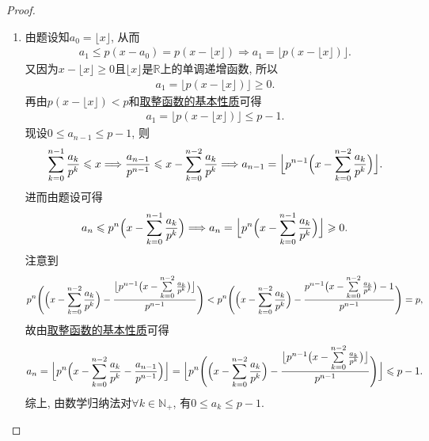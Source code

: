 \documentclass[../../main.tex]{subfiles}%
\begin{document}
\begin{proof}
\begin{enumerate}[(1)]
\item 由题设知$a_0=\lfloor x \rfloor$, 从而
\begin{align*}
a_1\leqslant p\left( x-a_0 \right) =p\left( x-\lfloor x \rfloor \right) \Longrightarrow a_1=\lfloor p\left( x-\lfloor x \rfloor \right) \rfloor .
\end{align*}
又因为$x-\lfloor x \rfloor \geqslant 0$且$\lfloor x \rfloor$是$\mathbb{R}$上的单调递增函数, 所以
\begin{align*}
a_1=\lfloor p\left( x-\lfloor x \rfloor \right) \rfloor \geqslant 0.
\end{align*}
再由$p\left( x-\lfloor x \rfloor \right) <p$和\hyperref[proposition:取整函数的基本性质]{取整函数的基本性质}可得
\begin{align*}
a_1=\lfloor p\left( x-\lfloor x \rfloor \right) \rfloor \leqslant p-1.
\end{align*}
现设$0\leqslant a_{n-1}\leqslant p-1$, 则
\begin{align*}
\sum_{k=0}^{n-1}\frac{a_k}{p^k}\leqslant x\Longrightarrow \frac{a_{n-1}}{p^{n-1}}\leqslant x-\sum_{k=0}^{n-2}\frac{a_k}{p^k}\Longrightarrow a_{n-1}=\Bigl\lfloor p^{n-1}\Bigl( x-\sum_{k=0}^{n-2}\frac{a_k}{p^k} \Bigr) \Bigr\rfloor .
\end{align*}
进而由题设可得
\begin{align*}
a_n\leqslant p^n\Bigl( x-\sum_{k=0}^{n-1}\frac{a_k}{p^k} \Bigr) \Longrightarrow a_n=\Bigl\lfloor p^n\Bigl( x-\sum_{k=0}^{n-1}\frac{a_k}{p^k} \Bigr) \Bigr\rfloor \geqslant 0.
\end{align*}
注意到
\begin{align*}
p^n\Biggl( \Bigl( x-\sum\limits_{k=0}^{n-2}\frac{a_k}{p^k} \Bigr) -\frac{\bigl\lfloor p^{n-1}\bigl( x-\sum\limits_{k=0}^{n-2}\frac{a_k}{p^k} \bigr) \bigr\rfloor}{p^{n-1}} \Biggr) <p^n\Biggl( \Bigl( x-\sum\limits_{k=0}^{n-2}\frac{a_k}{p^k} \Bigr) -\frac{p^{n-1}\bigl( x-\sum\limits_{k=0}^{n-2}\frac{a_k}{p^k} \bigr)-1}{p^{n-1}} \Biggr) =p,
\end{align*}
故由\hyperref[proposition:取整函数的基本性质]{取整函数的基本性质}可得
\begin{align*}
a_n=\Bigl\lfloor p^n\Bigl( x-\sum\limits_{k=0}^{n-2}\frac{a_k}{p^k}-\frac{a_{n-1}}{p^{n-1}} \Bigr) \Bigr\rfloor =\Bigl\lfloor p^n\Biggl( \Bigl( x-\sum\limits_{k=0}^{n-2}\frac{a_k}{p^k} \Bigr) -\frac{\bigl\lfloor p^{n-1}\bigl( x-\sum\limits_{k=0}^{n-2}\frac{a_k}{p^k} \bigr) \bigr\rfloor}{p^{n-1}} \Biggr) \Bigr\rfloor \leqslant p-1.
\end{align*}
综上, 由数学归纳法对$\forall k\in \mathbb{N}_+$, 有$0\leqslant a_k\leqslant p-1$.


\end{enumerate}
\end{proof}
\end{document}
